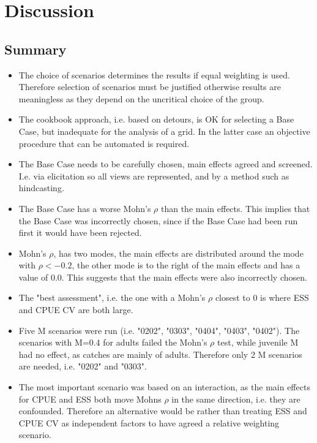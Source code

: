 \section*{Discussion}

\subsection*{Summary}

\begin{itemize}
    \item The choice of scenarios determines the results if equal weighting is used. Therefore selection of scenarios must be justified otherwise results are meaningless as they depend on the uncritical choice of the group.
    \item The cookbook approach, i.e. based on detours, is OK for selecting a Base Case, but inadequate for the analysis of a grid. In the latter case an objective procedure that can be automated is required.
    \item The Base Case needs to be carefully chosen, main effects agreed and screened. I.e. via elicitation so all views are represented, and by a method such as hindcasting.
    \item The Base Case has a worse Mohn's $\rho$ than the main effects. This implies that the Base Case was incorrectly chosen, since if the Base Case had been run first it would have been rejected.
    \item Mohn's $\rho$, has two modes,  the main effects are distributed around the mode with $\rho < -0.2$, the other mode is to the right of the main effects and has a value of $0.0$. This suggests that the main effects were also incorrectly chosen.
    \item The "best assessment", i.e. the one with a Mohn's $\rho$ closest to 0 is where ESS and CPUE CV are both large. 
    \item Five M scenarios were run (i.e. "0202", "0303", "0404", "0403", "0402"). The scenarios with M=0.4 for adults failed the Mohn's $\rho$ test, while juvenile M had no effect, as catches are mainly of adults. Therefore only 2 M scenarios are needed, i.e. "0202" and "0303". 
    \item The most important scenario was based on an interaction, as the main effects for CPUE and ESS both move Mohns $\rho$ in the same direction, i.e. they are confounded. Therefore an alternative would be rather than treating ESS and CPUE CV as independent factors to have agreed a relative weighting scenario.

\end{itemize}

